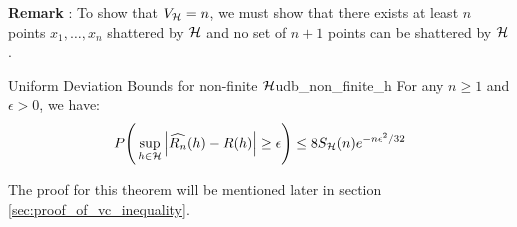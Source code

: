 \textbf{Remark} : To show that $V_{\mathcal{H}}=n$, we must show that there exists at least $n$ points $x_1, \dots, x_n$ shattered by $\mathcal{H}$ and no set of $n+1$ points can be shattered by $\mathcal{H}$. 

\begin{theorem}{Uniform Deviation Bounds for non-finite $\mathcal{H}$}{udb_non_finite_h}
    For any $n\ge1$ and $\epsilon>0$, we have:
    \begin{align*}
        P\Bigg( 
            \sup_{h\in\mathcal{H}} \Big| 
                \widehat{R_n}(h) - R(h)
             \Big| \ge \epsilon
         \Bigg) \le 8S_{\mathcal{H}}(n) e^{-n\epsilon^2/32}
    \end{align*}
\end{theorem}

\begin{proof*}
    The proof for this theorem will be mentioned later in section \ref{sec:proof_of_vc_inequality}.
\end{proof*}


